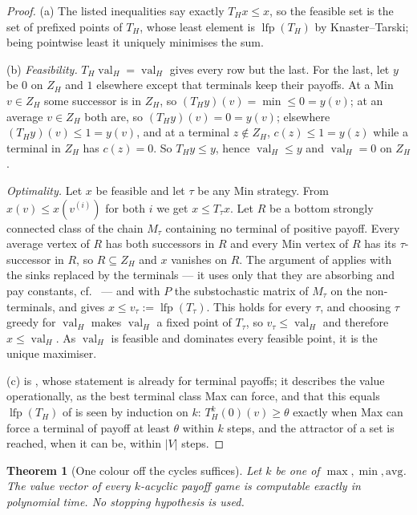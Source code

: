 \documentclass[11pt]{article}
\theoremstyle{plain}
\newtheorem{theorem}{Theorem}[section]
\theoremstyle{definition}
\DeclareMathOperator{\val}{val}
\DeclareMathOperator{\lfp}{lfp}
\begin{document}
\begin{proof}
(a) The listed inequalities say exactly $T_Hx\le x$, so the feasible set is
the set of prefixed points of $T_H$, whose least element is $\lfp(T_H)$ by
Knaster--Tarski; being pointwise least it uniquely minimises the sum.

(b) \emph{Feasibility.} $T_H\val_H=\val_H$ gives every row but the last.
For the last, let $y$ be $0$ on $Z_H$ and $1$ elsewhere except that
terminals keep their payoffs. At a Min $v\in Z_H$ some successor is in
$Z_H$, so $(T_Hy)(v)=\min\le0=y(v)$; at an average $v\in Z_H$ both are, so
$(T_Hy)(v)=0=y(v)$; elsewhere $(T_Hy)(v)\le1=y(v)$, and at a terminal
$z\notin Z_H$, $c(z)\le1=y(z)$ while a terminal in $Z_H$ has $c(z)=0$. So
$T_Hy\le y$, hence $\val_H\le y$ and $\val_H=0$ on $Z_H$.

\emph{Optimality.} Let $x$ be feasible and let $\tau$ be any Min strategy.
From $x(v)\le x(v^{(i)})$ for both $i$ we get $x\le T_\tau x$. Let $R$ be a
bottom strongly connected class of the chain $M_\tau$ containing no
terminal of positive payoff. Every average vertex of $R$ has both
successors in $R$ and every Min vertex of $R$ has its $\tau$-successor in
$R$, so $R\subseteq Z_H$ and $x$ vanishes on $R$. The argument of
 applies with the sinks replaced by the
terminals --- it uses only that they are absorbing and pay constants,
cf.\  --- and with $P$ the substochastic matrix of
$M_\tau$ on the non-terminals, and gives $x\le v_\tau:=\lfp(T_\tau)$. This holds for every $\tau$, and
choosing $\tau$ greedy for $\val_H$ makes $\val_H$ a fixed point of
$T_\tau$, so $v_\tau\le\val_H$ and therefore $x\le\val_H$. As $\val_H$ is
feasible and dominates every feasible point, it is the unique maximiser.

(c) is , whose statement is already for terminal
payoffs; it describes the value operationally, as the best terminal class
Max can force, and that this equals $\lfp(T_H)$ of  is
seen by induction on $k$: $T_H^{k}(0)(v)\ge\theta$ exactly when Max can
force a terminal of payoff at least $\theta$ within $k$ steps, and the
attractor of a set is reached, when it can be, within $|V|$ steps.
\end{proof}

\begin{theorem}[One colour off the cycles suffices]\label{thm:kacyclic}
Let $k$ be one of $\max,\min,\mathrm{avg}$. The value vector of every
$k$-acyclic payoff game is computable exactly in polynomial time. No
stopping hypothesis is used.
\end{theorem}
\end{document}
